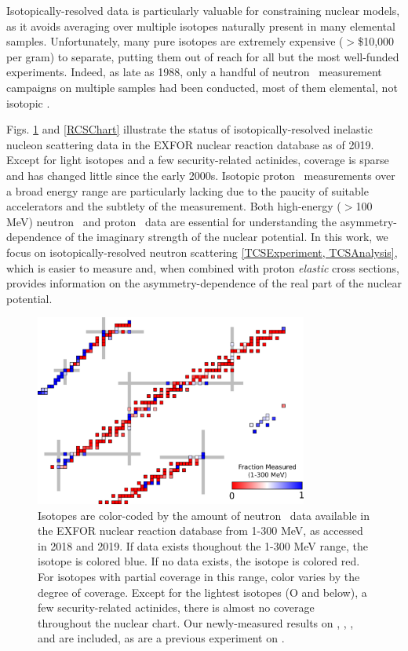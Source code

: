 Isotopically-resolved data is particularly valuable for constraining nuclear
models, as it avoids averaging over multiple isotopes naturally present in many elemental samples.
Unfortunately, many pure isotopes are extremely expensive ($>$\$10,000 per gram) to
separate, putting them out of reach for all but the most well-funded experiments.
Indeed, as late as 1988, only a handful of neutron \tot\ measurement campaigns
on multiple samples had been conducted, most of them elemental, not isotopic
\cite{BrookhavenBook1988}.

Figs. \ref{TCSChart} and \ref{RCSChart} illustrate the status of isotopically-resolved inelastic
nucleon scattering data in the EXFOR nuclear reaction database as of 2019.
Except for light isotopes and a few security-related actinides, coverage is
sparse and has changed little since the early 2000s. Isotopic proton \rxn\ measurements over
a broad energy range are particularly lacking due to the paucity of suitable
accelerators and the subtlety of the measurement. 
Both high-energy ($>$100 MeV) neutron \tot\ and proton \rxn\ data are essential for
understanding the asymmetry-dependence of the imaginary strength of the nuclear potential.
In this work, we focus on isotopically-resolved neutron scattering
\ref{TCSExperiment, TCSAnalysis}, which
is easier to measure and, when combined with proton \textit{elastic} cross sections,
provides information on the asymmetry-dependence of the real part of the nuclear potential.

\begin{figure}[h]
    \centering
    \includegraphics[width=0.8\textwidth]{figures/TCSChart.png}
    \caption[Landscape of existing neutron \tot\ data in 2019]
    {Isotopes are color-coded by the amount of neutron \tot\ data available in the EXFOR nuclear
        reaction database from 1-300 MeV, as accessed in 2018 and 2019. If data exists thoughout the
        1-300 MeV range, the isotope
        is colored blue. If no data exists, the isotope is colored red. For
        isotopes with partial coverage in this range, color varies by the degree
        of coverage. Except for the lightest
        isotopes (O and below), a few security-related actinides, there is almost no coverage
        throughout the nuclear chart. Our newly-measured results on \oSixEight, \niEightFour,
        \rhThree, and \snTwelveFour are included, as are a previous experiment on
        \caAughtEight \cite{Shane2010}.
    }
    \label{TCSChart}
\end{figure}

